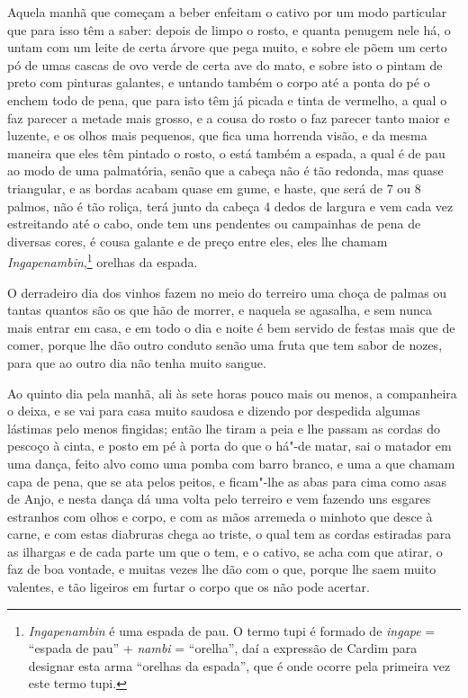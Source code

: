  Aquela manhã que começam a beber enfeitam o cativo por um modo
particular que para isso têm a saber: depois de limpo o rosto, e quanta
penugem nele há, o untam com um leite de certa árvore que pega muito,
e sobre ele põem um certo pó de umas cascas de ovo verde de certa ave
do mato, e sobre isto o pintam de preto com pinturas galantes, e
untando também o corpo até a ponta do pé o enchem todo de pena, que
para isto têm já picada e tinta de vermelho, a qual o faz parecer a
metade mais grosso, e a cousa do rosto o faz parecer tanto maior e
luzente, e os olhos mais pequenos, que fica uma horrenda visão, e da
mesma maneira que eles têm pintado o rosto, o está também a espada, a
qual é de pau ao modo de uma palmatória, senão que a cabeça não é tão
redonda, mas quase triangular, e as bordas acabam quase em gume, e
haste, que será de 7 ou 8 palmos, não é tão roliça, terá junto da
cabeça 4 dedos de largura e vem cada vez estreitando até o cabo, onde
tem uns pendentes ou campainhas de pena de diversas cores, é cousa
galante e de preço entre eles, eles lhe chamam
\textit{Ingapenambin},\footnote{ \textit{Ingapenambin} é uma espada
de pau. O termo tupi é formado de \textit{ingape} = ``espada de pau'' +
\textit{nambi} = ``orelha'', daí a expressão de Cardim para designar esta
arma ``orelhas da espada'', que é onde ocorre pela primeira vez este
termo tupi.} orelhas da espada. 

 O derradeiro dia dos vinhos fazem no meio do terreiro uma choça de
palmas ou tantas quantos são os que hão de morrer, e naquela se
agasalha, e sem nunca mais entrar em casa, e em todo o dia e noite é
bem servido de festas mais que de comer, porque lhe dão outro conduto
senão uma fruta que tem sabor de nozes, para que ao outro dia não tenha
muito sangue.

Ao quinto dia pela manhã, ali às sete horas pouco mais ou
menos, a companheira o deixa, e se vai para casa muito saudosa e
dizendo por despedida algumas lástimas pelo menos fingidas; então lhe
tiram a peia e lhe passam as cordas do pescoço à cinta, e posto em pé à
porta do que o há"-de matar, sai o matador em uma dança, feito alvo como
uma pomba com barro branco, e uma a que chamam capa de pena, que se ata
pelos peitos, e ficam"-lhe as abas para cima como asas de Anjo, e nesta
dança dá uma volta pelo terreiro e vem fazendo uns esgares estranhos
com olhos e corpo, e com as mãos arremeda o minhoto que desce à carne,
e com estas diabruras chega ao triste, o qual tem as cordas estiradas
para as ilhargas e de cada parte um que o tem, e o cativo, se acha com
que atirar, o faz de boa vontade, e muitas vezes lhe dão com o que,
porque lhe saem muito valentes, e tão ligeiros em furtar o corpo que
os não pode acertar.

